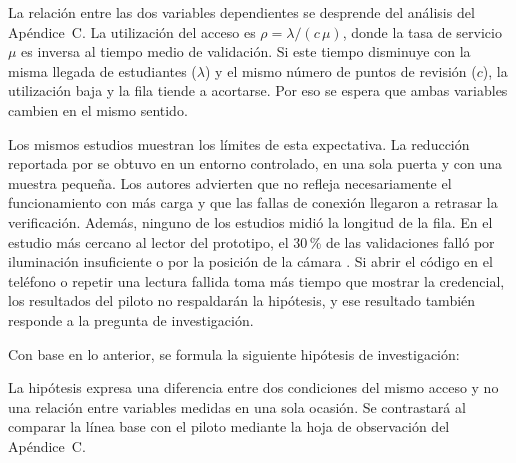 La relación entre las dos variables dependientes se desprende del análisis
del Apéndice~C. La utilización del acceso es $\rho = \lambda / (c\,\mu)$, donde
la tasa de servicio $\mu$ es inversa al tiempo medio de validación. Si este
tiempo disminuye con la misma llegada de estudiantes ($\lambda$) y el mismo
número de puntos de revisión ($c$), la utilización baja y la fila tiende a
acortarse. Por eso se espera que ambas variables cambien en el mismo sentido.

Los mismos estudios muestran los límites de esta expectativa. La reducción
reportada por \textcite{john2026qrgate} se obtuvo en un entorno controlado,
en una sola puerta y con una muestra pequeña. Los autores advierten que no
refleja necesariamente el funcionamiento con más carga y que las fallas de
conexión llegaron a retrasar la verificación. Además, ninguno de los estudios
midió la longitud de la fila. En el estudio más cercano al lector del
prototipo, el 30\,\% de las validaciones falló por iluminación insuficiente
o por la posición de la cámara \parencite{henriana2026gate}. Si abrir el código en el
teléfono o repetir una lectura fallida toma más tiempo que mostrar la
credencial, los resultados del piloto no respaldarán la hipótesis, y ese
resultado también responde a la pregunta de investigación.

Con base en lo anterior, se formula la siguiente hipótesis de investigación:

\medskip
{\setlength{\fboxsep}{8pt}%
\noindent{}}
\medskip

La hipótesis expresa una diferencia entre dos condiciones del mismo acceso y
no una relación entre variables medidas en una sola ocasión. Se contrastará
al comparar la línea base con el piloto mediante la hoja de observación del
Apéndice~C.

%
%
%


